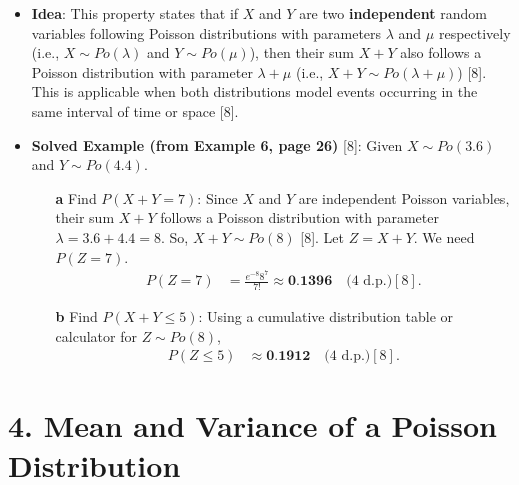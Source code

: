 \documentclass[12pt]{article}
\begin{document}
\begin{itemize}
    \item \textbf{Idea}: This property states that if $X$ and $Y$ are two \textbf{independent} random variables following Poisson distributions with parameters $\lambda$ and $\mu$ respectively (i.e., $X \sim Po(\lambda)$ and $Y \sim Po(\mu)$), then their sum $X+Y$ also follows a Poisson distribution with parameter $\lambda+\mu$ (i.e., $X+Y \sim Po(\lambda+\mu)$) [8]. This is applicable when both distributions model events occurring in the same interval of time or space [8].

    \item \textbf{Solved Example (from Example 6, page 26)} [8]:
    Given $X \sim Po(3.6)$ and $Y \sim Po(4.4)$.
    \begin{enumerate}
        \item[\textbf{a}] Find $P(X+Y=7)$:
        Since $X$ and $Y$ are independent Poisson variables, their sum $X+Y$ follows a Poisson distribution with parameter $\lambda = 3.6 + 4.4 = 8$. So, $X+Y \sim Po(8)$ [8].
        Let $Z = X+Y$. We need $P(Z=7)$.
        \begin{align*}
        P(Z=7) &= \frac{e^{-8} 8^7}{7!} \approx \textbf{0.1396} \quad \text{(4 d.p.)} [8].
        \end{align*}
        \item[\textbf{b}] Find $P(X+Y \le 5)$:
        Using a cumulative distribution table or calculator for $Z \sim Po(8)$,
        \begin{align*}
        P(Z \le 5) &\approx \textbf{0.1912} \quad \text{(4 d.p.)} [8].
        \end{align*}
    \end{enumerate}
\end{itemize}

\section*{4. Mean and Variance of a Poisson Distribution}
\end{document}

